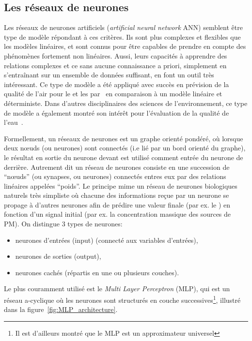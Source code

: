 \subsection{Les réseaux de neurones}%
\label{sub:les_réseaux_de_neurones}

Les réseaux de neurones artificiels (\textit{artificial neural network} ANN) semblent être
type de modèle répondant à ces critères. Ils sont plus complexes et flexibles que les
modèles linéaires, et sont connus pour être capables de prendre en compte des phénomènes
fortement non linéaires. Aussi, leurs capacités à apprendre des relations complexes et ce
sans aucune connaissance a priori, simplement en s'entraînant sur un ensemble de données
suffisant, en font un outil très intéressant.
Ce type de modèle a été appliqué avec succès en prévision de la qualité de l'air pour le
 et les \PMdix{} par~\cite{kukkonenExtensive2003} en comparaison à un modèle
linéaire et déterministe. Dans d'autres disciplinaires des sciences de l'environnement, ce
type de modèle a également montré son intérêt pour l'évaluation de la qualité de
l'eau~\autocite{nathanApplication2017}.

Formellement, un réseaux de neurones est un graphe orienté pondéré, où lorsque deux
nœuds (ou neurones) sont connectés (i.e lié par un bord orienté du graphe), le résultat en
sortie du neurone devant est utilisé comment entrée du neurone de derrière.
Autrement dit un réseau de neurones consiste en une succession de ``nœuds'' (ou synapses, ou
neurones) connectés entres eux par des relations linéaires appelées ``poids''. Le principe
mime un réseau de neurones biologiques naturels très simpliste où chacune des
informations reçue par un neurone se propage à d'autres neurones afin de prédire une
valeur finale (par ex. le \POv) en fonction d'un signal initial (par ex. la
concentration massique des sources de PM).
On distingue 3 types de neurones:
\begin{itemize}
    \item neurones d'entrées (input) (connecté aux variables d'entrées),
    \item neurones de sorties (output),
    \item neurones cachés (répartis en une ou plusieurs couches).
\end{itemize}
Le plus couramment utilisé est le \textit{Multi Layer Perceptron} (MLP), qui est un
réseau a-cyclique où les neurones sont structurés en couche successives\footnote{Il est
d'ailleurs montré que le MLP est un approximateur universel}, illustré dans la
figure~\ref{fig:MLP_architecture}.

